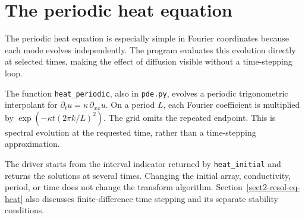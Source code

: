 \begin{listing}[H]
\caption{An exact reference solution for the Poisson test.}
\label{listing-sol}
\end{listing}

\begin{listing}[H]
\caption{The reference boundary value at $x=0$.}
\label{listing-u_0y}
\end{listing}

\section{The periodic heat equation}
\label{sect1-listing-heat}

The periodic heat equation is especially simple in Fourier coordinates
because each mode evolves independently. The program evaluates this
evolution directly at selected times, making the effect of diffusion visible
without a time-stepping loop.

The function \texttt{heat\_periodic}, also in \texttt{pde.py}, evolves
a periodic trigonometric interpolant for
$\partial_t u=\kappa\,\partial_{xx}u$. On a period $L$, each Fourier
coefficient is multiplied by
$\exp(-\kappa t(2\pi k/L)^2)$. The grid omits the repeated endpoint.
This is spectral evolution at the requested time, rather than a
time-stepping approximation.

The driver starts from the interval indicator returned by
\texttt{heat\_initial} and returns the solutions at several times.
Changing the initial array, conductivity, period, or time does not
change the transform algorithm. Section~\ref{sect2-resol-eq-heat}
also discusses finite-difference time stepping and its separate
stability conditions.
\begin{listing}[H]
\caption{Heat evolution at several times from the same initial data.}
\label{heat-listing}
\end{listing}

\begin{listing}[H]
\caption{Spectral heat evolution with an explicit period and conductivity.}
\label{listing-solve_eq}
\end{listing}

\begin{listing}[H]
\caption{An interval indicator as initial temperature.}
\label{listing-f-heat}
\end{listing}

